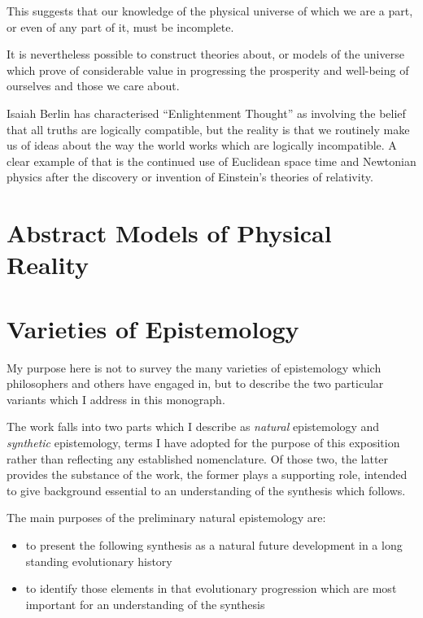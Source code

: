 \documentclass[10pt,titlepage]{book}
\begin{document}
This suggests that our knowledge of the physical universe of which we are a part, or even of any part of it, must be incomplete.

It is nevertheless possible to construct theories about, or models of the universe which prove of considerable value in progressing the prosperity and well-being of ourselves and those we care about.

Isaiah Berlin has characterised ``Enlightenment Thought'' as involving the belief that all truths are logically compatible, but the reality is that we routinely make us of ideas about the way the world works which are logically incompatible.
A clear example of that is the continued use of Euclidean space time and Newtonian physics after the discovery or invention of Einstein's theories of relativity.

\chapter{Abstract Models of Physical Reality}

\appendix

\chapter{Varieties of Epistemology}


My purpose here is not to survey the many varieties of epistemology which philosophers and others have engaged in, but to describe the two particular variants which I address in this monograph.

The work falls into two parts which I describe as \emph{natural} epistemology and \emph{synthetic} epistemology, terms I have adopted for the purpose of this exposition rather than reflecting any established nomenclature.
Of those two, the latter provides the substance of the work, the former plays a supporting role, intended to give background essential to an understanding of the synthesis which follows.

The main purposes of the preliminary natural epistemology are:
\begin{itemize}
\item to present the following synthesis as a natural future development in a long standing evolutionary history
\item to identify those elements in that evolutionary progression which are most important for an understanding of the synthesis
\end{itemize}
\end{document}
